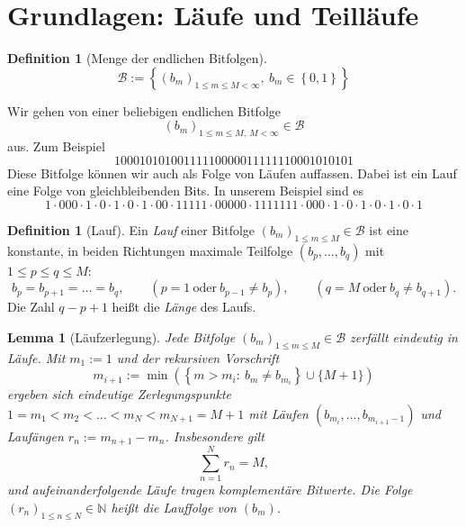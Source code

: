 \documentclass[11pt,a4paper]{scrartcl}
\theoremstyle{plain}
\newtheorem{lemma}[satz]{Lemma}
\theoremstyle{definition}
\newtheorem{defi}[satz]{Definition}
\theoremstyle{remark}
\begin{document}
\section{Grundlagen: Läufe und Teilläufe}\label{sec:grundlagen}

\begin{defi}[Menge der endlichen Bitfolgen]\label{defi:bitfolgen}
\begin{equation}\label{eqn:mengederbitfolgen}
  \mathcal B := \left\{(b_m)_{1\leq m\leq M<\infty},\ b_m\in\left\{0,1\right\}\right\}
\end{equation}
\end{defi}

\noindent Wir gehen von einer beliebigen endlichen Bitfolge
\begin{equation}\label{eqn:beliebigebitfolge}
  (b_m)_{1\leq m\leq M,\ M<\infty}\in\mathcal B
\end{equation}
aus. Zum Beispiel
\begin{equation}\label{eqn:runtestfolge}
  10001010100111110000011111110001010101
\end{equation}
Diese Bitfolge können wir auch als Folge von Läufen auffassen. Dabei ist
ein Lauf eine Folge von gleichbleibenden Bits. In unserem Beispiel sind
es
\begin{equation}\label{eqn:runtestfolgevonlaeufen}
  1\cdot 000\cdot 1\cdot 0\cdot 1\cdot 0\cdot 1\cdot 00\cdot 11111\cdot
  00000\cdot 1111111\cdot 000\cdot 1\cdot 0\cdot 1\cdot 0\cdot 1\cdot 0\cdot 1
\end{equation}
\begin{defi}[Lauf]\label{defi:laeufe}
Ein \emph{Lauf} einer Bitfolge $(b_m)_{1\leq m\leq M}\in\mathcal B$ ist eine
konstante, in beiden Richtungen maximale Teilfolge $(b_p,\dots,b_q)$ mit
$1\leq p\leq q\leq M$:
\begin{equation}\label{eqn:mengederlaeufe}
  b_p=b_{p+1}=\dots=b_q,\qquad
  \left(p=1\ \text{oder}\ b_{p-1}\neq b_p\right),\qquad
  \left(q=M\ \text{oder}\ b_q\neq b_{q+1}\right).
\end{equation}
Die Zahl $q-p+1$ heißt die \emph{Länge} des Laufs.
\end{defi}

\begin{lemma}[Läufzerlegung]\label{lem:lzerlegung}
Jede Bitfolge $(b_m)_{1\leq m\leq M}\in\mathcal B$ zerfällt eindeutig in
Läufe. Mit $m_1:=1$ und der rekursiven Vorschrift
\begin{equation}\label{eqn:zerlegung}
  m_{i+1}:=\min\left(\left\{m>m_i:\ b_m\neq b_{m_i}\right\}\cup\{M+1\}\right)
\end{equation}
ergeben sich eindeutige Zerlegungspunkte
$1=m_1<m_2<\dots<m_N<m_{N+1}=M+1$ mit Läufen
$(b_{m_i},\dots,b_{m_{i+1}-1})$ und Laufängen $r_n:=m_{n+1}-m_n$.
Insbesondere gilt
\begin{equation}
  \sum_{n=1}^{N} r_n=M,
\end{equation}
und aufeinanderfolgende Läufe tragen komplementäre Bitwerte. Die Folge
$(r_n)_{1\leq n\leq N}\in\mathbb N$ heißt die \emph{Lauffolge} von
$(b_m)$.
\end{lemma}
\end{document}
